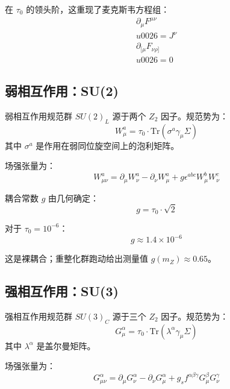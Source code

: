 在 $\tau_0$ 的领头阶，这重现了麦克斯韦方程组：
\begin{align}
    \partial_\mu F^{\mu\nu} \\u0026= J^\nu \\
    \partial_{[\mu} F_{\nu\rho]} \\u0026= 0
\end{align}

\subsection{弱相互作用：SU(2)}

弱相互作用规范群 $SU(2)_L$ 源于两个 $Z_2$ 因子。规范势为：
\begin{equation}
    W^a_\mu = \tau_0 \cdot \text{Tr}(\sigma^a \gamma_\mu \Sigma)
\end{equation}
其中 $\sigma^a$ 是作用在弱同位旋空间上的泡利矩阵。

场强张量为：
\begin{equation}
    W^a_{\mu\nu} = \partial_\mu W^a_\nu - \partial_\nu W^a_\mu + g \epsilon^{abc} W^b_\mu W^c_\nu
\end{equation}

耦合常数 $g$ 由几何确定：
\begin{equation}
    g = \tau_0 \cdot \sqrt{2}
\end{equation}

对于 $\tau_0 = 10^{-6}$：
\begin{equation}
    g \approx 1.4 \times 10^{-6}
\end{equation}

这是裸耦合；重整化群跑动给出测量值 $g(m_Z) \approx 0.65$。

\subsection{强相互作用：SU(3)}

强相互作用规范群 $SU(3)_C$ 源于三个 $Z_2$ 因子。规范势为：
\begin{equation}
    G^\alpha_\mu = \tau_0 \cdot \text{Tr}(\lambda^\alpha \gamma_\mu \Sigma)
\end{equation}
其中 $\lambda^\alpha$ 是盖尔曼矩阵。

场强张量为：
\begin{equation}
    G^\alpha_{\mu\nu} = \partial_\mu G^\alpha_\nu - \partial_\nu G^\alpha_\mu + g_s f^{\alpha\beta\gamma} G^\beta_\mu G^\gamma_\nu
\end{equation}

